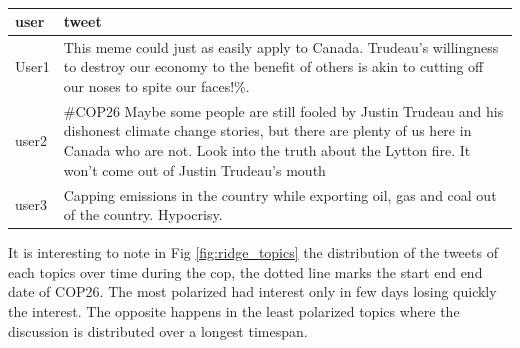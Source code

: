 \begin{table}[]
\centering
\begin{tabular}{|p{1in}|p{4in}|}\hline
\textbf{user} & \textbf{tweet} \\ \hline
User1     & This meme could just as easily apply to Canada. Trudeau’s willingness to destroy our economy to the benefit of others is akin to cutting off our noses to spite our faces!\%. \\ \hline
user2        & \#COP26 Maybe some people are still fooled by Justin Trudeau and his dishonest climate change stories, but there are plenty of us here in Canada who are not. Look into the truth about the Lytton fire. It won't come out of Justin Trudeau's mouth \\ \hline
user3          & Capping emissions in the country while exporting oil, gas and coal out of the country. Hypocrisy.
 \\ \hline
\end{tabular}
\caption{}
\label{tab:canadatweets}
\end{table}




It is interesting to note in Fig \ref{fig:ridge_topics} the distribution of the tweets of each topics over time during the cop, the dotted line marks the start end end date of COP26. The most polarized had interest only in few days losing quickly the interest. The opposite happens in the least polarized topics where the discussion is distributed over a longest timespan.  



